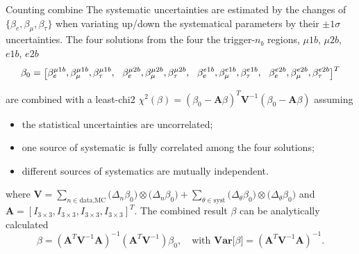 \begin{frame}{Counting combine}
\smaller
    The systematic uncertainties are estimated by the changes of $\{\beta_{e},\beta_{\mu},\beta_{\tau}\}$ when variating up/down the systematical parameters by their $\pm 1\sigma$ uncertainties.
    The four solutions from the four the trigger-$n_b$ regions, $\mu 1b$, $\mu 2b$, $e1b$, $e2b$
    \begin{equation*}
        \tiny
        \beta_0 = \bigg [
        \beta_e^{\mu1b}, \beta_\mu^{\mu1b}, \beta_\tau^{\mu1b}, \quad 
        \beta_e^{\mu2b}, \beta_\mu^{\mu2b}, \beta_\tau^{\mu2b}, \quad 
        \beta_e^{e1b}, \beta_\mu^{e1b}, \beta_\tau^{e1b}, \quad
        \beta_e^{e2b}, \beta_\mu^{e2b}, \beta_\tau^{e2b}
        \bigg ]^T
    \end{equation*}
    
    are combined with a least-chi2 $\chi^2(\beta) = (\beta_0 - \textbf{A} \beta )^T \textbf{V}^{-1} (\beta_0 - \textbf{A} \beta ) $ assuming
    \begin{itemize}
        \item the statistical uncertainties are uncorrelated;
        \item one source of systematic is fully correlated among the four solutions;
        \item different sources of systematics are mutually independent.
    \end{itemize}

    where 
    $\textbf{V} =
    \sum_{n \in \text{data,MC}} \big( \Delta_{n}\beta_0 \big) \otimes   \big( \Delta_{n}\beta_0 \big) +
    \sum_{\theta \in \text{syst}} \big( \Delta_{\theta}\beta_0 \big) \otimes  \big( \Delta_{\theta}\beta_0 \big)
    $
    and $\textbf{A}=[I_{3\times3}, I_{3\times3}, I_{3\times3}, I_{3\times3}]^T$. The combined result $\beta$ can be analytically calculated 
    \begin{equation*}
        \beta =   (\textbf{A}^T \textbf{V}^{-1} \textbf{A})^{-1}(\textbf{A}^T \textbf{V}^{-1}) \beta_0, \quad
        \text{with } \textbf{Var}\big[\beta\big]  =   (\textbf{A}^T \textbf{V}^{-1} \textbf{A})^{-1} .
    \end{equation*}

\end{frame}



